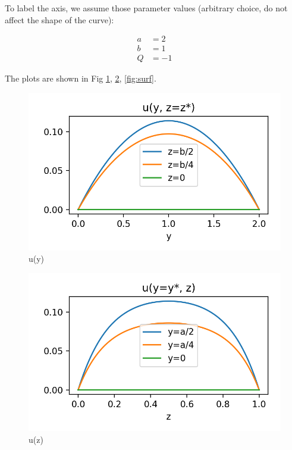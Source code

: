 \graphicspath{ {./JiaweiZhuang/} }

\begin{solution} 

To label the axis, we assume those parameter values (arbitrary choice, do not affect the shape of the curve):

\begin{align*}
a &= 2 \\
b &= 1 \\
Q &= -1
\end{align*}

The plots are shown in Fig \ref{fig:u(y)}, \ref{fig:u(z)}, \ref{fig:surf}.

\begin{figure}[H]
\includegraphics[scale=1]{u(y)}
\centering
\caption{u(y)}
\label{fig:u(y)}
\end{figure}

\begin{figure}[H]
\includegraphics[scale=1]{u(z)}
\centering
\caption{u(z)}
\label{fig:u(z)}
\end{figure}

\end{solution} 

